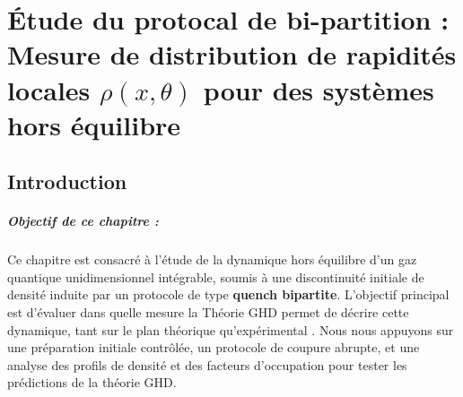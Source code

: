 \chapter{Étude du protocal de bi-partition : Mesure de distribution de rapidités locales $\rho(x , \theta ) $  pour des systèmes hors équilibre}
\minitoc


\section*{Introduction}


\paragraph{Objectif de ce chapitre :}
Ce chapitre est consacré à l’étude de la dynamique hors équilibre d’un gaz quantique unidimensionnel intégrable, soumis à une discontinuité initiale de densité induite par un protocole de type {\bf quench bipartite}. L’objectif principal est d’évaluer dans quelle mesure la Théorie \gls{GHD} permet de décrire cette dynamique, tant sur le plan théorique qu’expérimental . Nous nous appuyons sur une préparation initiale contrôlée, un protocole de coupure abrupte, et une analyse des profils de densité et des facteurs d’occupation pour tester les prédictions de la théorie \gls{GHD}.



